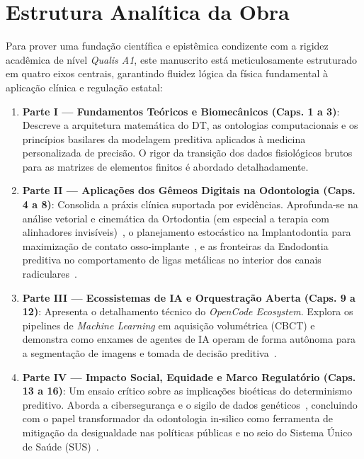\section{Estrutura Analítica da Obra}

Para prover uma fundação científica e epistêmica condizente com a rigidez acadêmica de nível \textit{Qualis A1}, este manuscrito está meticulosamente estruturado em quatro eixos centrais, garantindo fluidez lógica da física fundamental à aplicação clínica e regulação estatal:

\begin{enumerate}
    \item \textbf{Parte I --- Fundamentos Teóricos e Biomecânicos (Caps. 1 a 3)}: Descreve a arquitetura matemática do DT, as ontologias computacionais e os princípios basilares da modelagem preditiva aplicados à medicina personalizada de precisão. O rigor da transição dos dados fisiológicos brutos para as matrizes de elementos finitos é abordado detalhadamente.
    \item \textbf{Parte II --- Aplicações dos Gêmeos Digitais na Odontologia (Caps. 4 a 8)}: Consolida a práxis clínica suportada por evidências. Aprofunda-se na análise vetorial e cinemática da Ortodontia (em especial a terapia com alinhadores invisíveis)~\cite{li2025impacts, olawade2026advancing}, o planejamento estocástico na Implantodontia para maximização de contato osso-implante~\cite{alshadidi2024surface}, e as fronteiras da Endodontia preditiva no comportamento de ligas metálicas no interior dos canais radiculares~\cite{elsaid2025digital}.
    \item \textbf{Parte III --- Ecossistemas de IA e Orquestração Aberta (Caps. 9 a 12)}: Apresenta o detalhamento técnico do \textit{OpenCode Ecosystem}. Explora os pipelines de \textit{Machine Learning} em aquisição volumétrica (CBCT) e demonstra como enxames de agentes de IA operam de forma autônoma para a segmentação de imagens e tomada de decisão preditiva~\cite{opencode2026ecosystem, mdpi2025digital}.
    \item \textbf{Parte IV --- Impacto Social, Equidade e Marco Regulatório (Caps. 13 a 16)}: Um ensaio crítico sobre as implicações bioéticas do determinismo preditivo. Aborda a cibersegurança e o sigilo de dados genéticos~\cite{springer2026realising}, concluindo com o papel transformador da odontologia in-silico como ferramenta de mitigação da desigualdade nas políticas públicas e no seio do Sistema Único de Saúde (SUS)~\cite{cuadros2023assessing}.
\end{enumerate}

